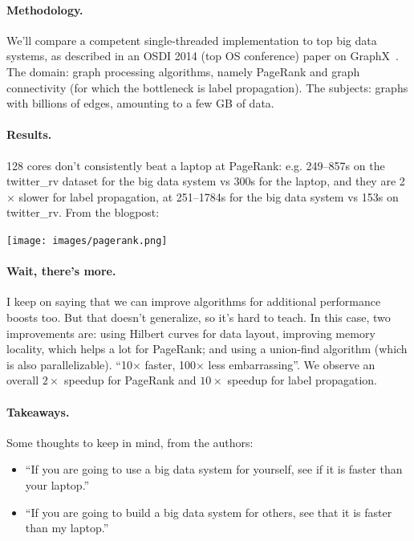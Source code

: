 \documentclass[a4paper]{report}
\begin{document}
\paragraph{Methodology.} We'll compare a competent single-threaded implementation to top
big data systems, as described in an OSDI 2014 (top OS conference) paper on GraphX~\cite{graphx}. The domain: graph processing
algorithms, namely PageRank and graph connectivity (for which the bottleneck is label propagation). The subjects: graphs with billions of edges, amounting to a few
GB of data.

\paragraph{Results.} 128 cores don't consistently beat a laptop at PageRank: e.g. 249--857s on the twitter\_rv dataset for the big data system vs 300s for the laptop, and they are 2$\times$ slower for label
propagation, at 251--1784s for the big data system vs 153s on
twitter\_rv. From the blogpost:

\begin{center}
	\texttt{[image: images/pagerank.png]}
\end{center}

\paragraph{Wait, there's more.} I keep on saying that we can improve algorithms for additional performance boosts too.
But that doesn't generalize, so it's hard to teach. In this case, two improvements are: using Hilbert curves
for data layout, improving memory locality, which helps a lot for PageRank; and using a union-find algorithm 
(which is also parallelizable). ``10$\times$ faster, 100$\times$ less embarrassing''.  We observe an overall
$2\times$ speedup for PageRank and $10\times$ speedup for label propagation.

\paragraph{Takeaways.} Some thoughts to keep in mind, from the authors:
\begin{itemize}
\item    ``If you are going to use a big data system for yourself, see if it is faster than your laptop.''
\item    ``If you are going to build a big data system for others, see that it is faster than my laptop.''
\end{itemize}
\end{document}
